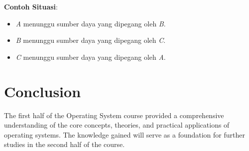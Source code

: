 \documentclass[12pt]{article}
\begin{document}
\textbf{Contoh Situasi}:
\begin{itemize}
    \item \textit{A} menunggu sumber daya yang dipegang oleh \textit{B}.
    \item \textit{B} menunggu sumber daya yang dipegang oleh \textit{C}.
    \item \textit{C} menunggu sumber daya yang dipegang oleh \textit{A}.
\end{itemize}

\section{Conclusion}
The first half of the Operating System course provided a comprehensive understanding of the core concepts, theories, and practical applications of operating systems. The knowledge gained will serve as a foundation for further studies in the second half of the course.
\end{document}
